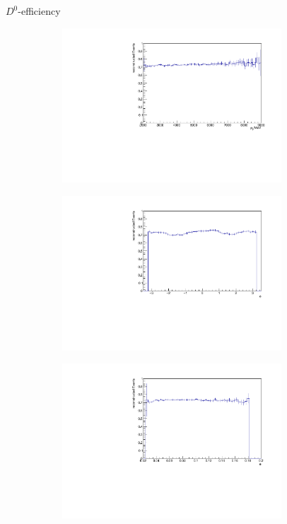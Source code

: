\documentclass[11pt]{beamer}
\begin{document}
\begin{frame}{$D^0$-efficiency}
\begin{figure}
\begin{subfigure}{0.45\textwidth}
\includegraphics[width=0.9\textwidth]{up_pdf/pos/h_pt_reco_D0_pos.pdf}
\end{subfigure}
\begin{subfigure}{0.45\textwidth}
\includegraphics[width=0.9\textwidth]{up_pdf/pos/h_phi_reco_D0_pos.pdf}
\end{subfigure}
\begin{subfigure}{0.45\textwidth}
\includegraphics[width=0.9\textwidth]{up_pdf/pos/h_theta_reco_D0_pos.pdf}

\end{subfigure}
\end{figure}
\end{frame}
\end{document}
